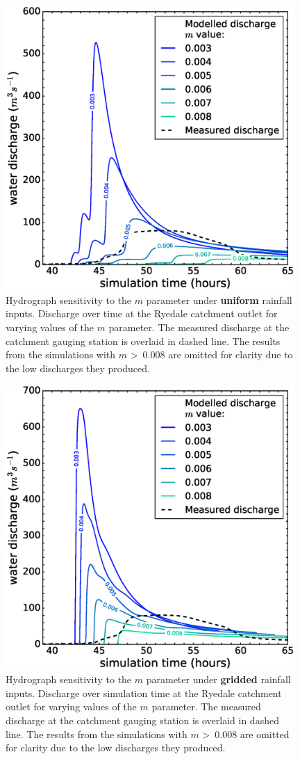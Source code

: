 \begin{figure}[!h]
\includegraphics[width=11cm]{chp_flood_figs_scripts/fig_ryedale_hydro_m_sens_lumped.eps}
\caption{Hydrograph sensitivity to the \(m\) parameter under \textbf{uniform} rainfall inputs. Discharge over time at the Ryedale catchment outlet for varying values of the \(m\) parameter. The measured discharge at the catchment gauging station is overlaid in dashed line. The results from the simulations with \(m\) \textgreater \ 0.008 are omitted for clarity due to the low discharges they produced.}
\label{fig_topmodel_m_ryedale_lumped}
\end{figure}

\begin{figure}[!h]
\includegraphics[width=11cm]{chp_flood_figs_scripts/fig_ryedale_hydro_m_sens_gridded.eps}
\caption{Hydrograph sensitivity to the \(m\) parameter under \textbf{gridded} rainfall inputs. Discharge over simulation time at the Ryedale catchment outlet for varying values of the \(m\) parameter. The measured discharge at the catchment gauging station is overlaid in dashed line. The results from the simulations with \(m\) \textgreater \ 0.008 are omitted for clarity due to the low discharges they produced.}
\label{fig_topmodel_m_ryedale_gridded}
\end{figure}


